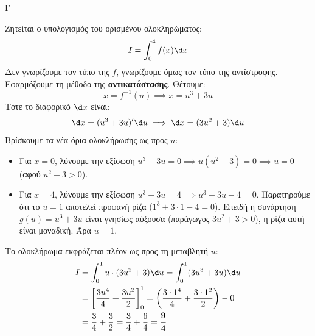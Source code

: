 \begin{thema}{Γ}
\begin{erwthma}
\item Ζητείται ο υπολογισμός του ορισμένου ολοκληρώματος:
\[ I = \int_0^4 f(x) \d x \]
Δεν γνωρίζουμε τον τύπο της $f$, γνωρίζουμε όμως τον τύπο της αντίστροφης.
Εφαρμόζουμε τη μέθοδο της \textbf{αντικατάστασης}. Θέτουμε:
\[ x = f^{-1}(u) \implies x = u^3 + 3u \]
Τότε το διαφορικό $\d x$ είναι:
\[ \d x = (u^3 + 3u)' \d u \implies \d x = (3u^2 + 3) \d u \]
Βρίσκουμε τα νέα όρια ολοκλήρωσης ως προς $u$:
\begin{itemize}
    \item Για $x = 0$, λύνουμε την εξίσωση $u^3 + 3u = 0 \implies u(u^2 + 3) = 0 \implies u = 0$ (αφού $u^2+3 > 0$).
    \item Για $x = 4$, λύνουμε την εξίσωση $u^3 + 3u = 4 \implies u^3 + 3u - 4 = 0$.
    Παρατηρούμε ότι το $u=1$ αποτελεί προφανή ρίζα ($1^3 + 3\cdot 1 - 4 = 0$). Επειδή η συνάρτηση $g(u) = u^3 + 3u$ είναι γνησίως αύξουσα (παράγωγος $3u^2+3>0$), η ρίζα αυτή είναι μοναδική. Άρα $u=1$.
\end{itemize}
Το ολοκλήρωμα εκφράζεται πλέον ως προς τη μεταβλητή $u$:
\begin{align*}
I &= \int_0^1 u \cdot (3u^2 + 3) \d u = \int_0^1 (3u^3 + 3u) \d u \\
&= \left[ \frac{3u^4}{4} + \frac{3u^2}{2} \right]_0^1 = \left( \frac{3 \cdot 1^4}{4} + \frac{3 \cdot 1^2}{2} \right) - 0 \\
&= \frac{3}{4} + \frac{3}{2} = \frac{3}{4} + \frac{6}{4} = \boldsymbol{\frac{9}{4}}
\end{align*}
\end{erwthma}
\end{thema}
